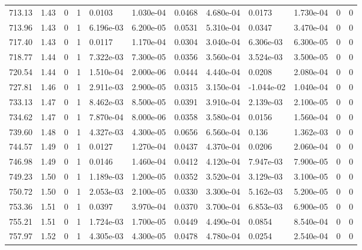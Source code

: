 \documentclass[preview]{standalone}
\begin{document}
{{{{{{{{{{{{{{{{{\begin{tabular}{L{1.2cm}C{1.2cm} C{0.3cm}C{0.5cm} C{1.4cm}C{1.4cm} C{1.4cm}C{1.4cm} C{1.6cm}C{1.6cm} C{1.6cm}C{1.6cm}}
  713.13  &  1.43  & 0     &  1 &  0.0103  & 1.030e-04  &  0.0468&   4.680e-04& 0.0173 & 1.730e-04   &  0 & 0  \\ 
  713.96  &  1.43  & 0     &  1 &  6.196e-03  & 6.200e-05  &  0.0531&   5.310e-04& 0.0347 & 3.470e-04   &  0 & 0  \\ 
  717.40  &  1.43  & 0     &  1 &  0.0117  & 1.170e-04  &  0.0304&   3.040e-04& 6.306e-03 & 6.300e-05   &  0 & 0  \\ 
  718.77  &  1.44  & 0     &  1 &  7.322e-03  & 7.300e-05  &  0.0356&   3.560e-04& 3.524e-03 & 3.500e-05   &  0 & 0  \\ 
  720.54  &  1.44  & 0     &  1 &  1.510e-04  & 2.000e-06  &  0.0444&   4.440e-04& 0.0208 & 2.080e-04   &  0 & 0  \\ 
  727.81  &  1.46  & 0     &  1 &  2.911e-03  & 2.900e-05  &  0.0315&   3.150e-04& -1.044e-02 & 1.040e-04   &  0 & 0  \\ 
  733.13  &  1.47  & 0     &  1 &  8.462e-03  & 8.500e-05  &  0.0391&   3.910e-04& 2.139e-03 & 2.100e-05   &  0 & 0  \\ 
  734.62  &  1.47  & 0     &  1 &  7.870e-04  & 8.000e-06  &  0.0358&   3.580e-04& 0.0156 & 1.560e-04   &  0 & 0  \\ 
  739.60  &  1.48  & 0     &  1 &  4.327e-03  & 4.300e-05  &  0.0656&   6.560e-04& 0.136 & 1.362e-03   &  0 & 0  \\ 
  744.57  &  1.49  & 0     &  1 &  0.0127  & 1.270e-04  &  0.0437&   4.370e-04& 0.0206 & 2.060e-04   &  0 & 0  \\ 
  746.98  &  1.49  & 0     &  1 &  0.0146  & 1.460e-04  &  0.0412&   4.120e-04& 7.947e-03 & 7.900e-05   &  0 & 0  \\ 
  749.23  &  1.50  & 0     &  1 &  1.189e-03  & 1.200e-05  &  0.0352&   3.520e-04& 3.129e-03 & 3.100e-05   &  0 & 0  \\ 
  750.72  &  1.50  & 0     &  1 &  2.053e-03  & 2.100e-05  &  0.0330&   3.300e-04& 5.162e-03 & 5.200e-05   &  0 & 0  \\ 
  753.36  &  1.51  & 0     &  1 &  0.0397  & 3.970e-04  &  0.0370&   3.700e-04& 6.853e-03 & 6.900e-05   &  0 & 0  \\ 
  755.21  &  1.51  & 0     &  1 &  1.724e-03  & 1.700e-05  &  0.0449&   4.490e-04& 0.0854 & 8.540e-04   &  0 & 0  \\ 
  757.97  &  1.52  & 0     &  1 &  4.305e-03  & 4.300e-05  &  0.0478&   4.780e-04& 0.0254 & 2.540e-04   &  0 & 0  \\ 
\hline 
\end{tabular} 

}}}}}}}}}}}}}}}}}
\end{document}
